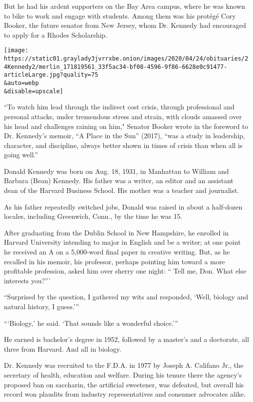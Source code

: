 But he had his ardent supporters on the Bay Area campus, where he was
known to bike to work and engage with students. Among them was his
protégé Cory Booker, the future senator from New Jersey, whom Dr.
Kennedy had encouraged to apply for a Rhodes Scholarship.

\texttt{[image: https://static01.graylady3jvrrxbe.onion/images/2020/04/24/obituaries/24Kennedy2/merlin\_171819561\_33f5ac34-bf08-4596-9f86-6628e0c91477-articleLarge.jpg?quality=75\\\&auto=webp\\\&disable=upscale]}

``To watch him lead through the indirect cost crisis, through
professional and personal attacks, under tremendous stress and strain,
with clouds amassed over his head and challenges raining on him,"
Senator Booker wrote in the foreword to Dr. Kennedy's memoir, ``A Place
in the Sun'' (2017), ``was a study in leadership, character, and
discipline, always better shown in times of crisis than when all is
going well.''

Donald Kennedy was born on Aug. 18, 1931, in Manhattan to William and
Barbara (Bean) Kennedy. His father was a writer, an editor and an
assistant dean of the Harvard Business School. His mother was a teacher
and journalist.

As his father repeatedly switched jobs, Donald was raised in about a
half-dozen locales, including Greenwich, Conn., by the time he was 15.

After graduating from the Dublin School in New Hampshire, he enrolled in
Harvard University intending to major in English and be a writer; at one
point he received an A on a 5,000-word final paper in creative writing.
But, as he recalled in his memoir, his professor, perhaps pointing him
toward a more profitable profession, asked him over sherry one night: ``
Tell me, Don. What else interests you?'''

``Surprised by the question, I gathered my wits and responded, `Well,
biology and natural history, I guess.'''

```Biology,' he said. `That sounds like a wonderful choice.'''

He earned is bachelor's degree in 1952, followed by a master's and a
doctorate, all three from Harvard. And all in biology.

Dr. Kennedy was recruited to the F.D.A. in 1977 by Joseph A. Califano
Jr., the secretary of health, education and welfare. During his tenure
there the agency's proposed ban on saccharin, the artificial sweetener,
was defeated, but overall his record won plaudits from industry
representatives and consumer advocates alike.

